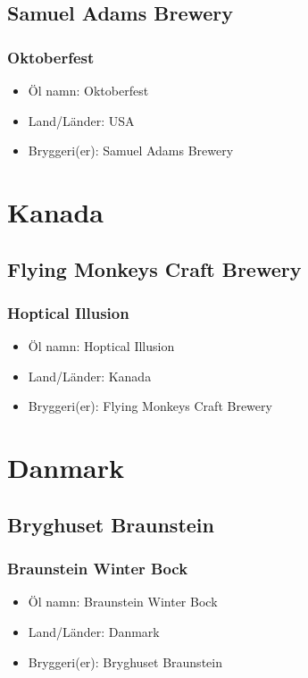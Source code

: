\documentclass[11pt]{article}
\begin{document}
\subsection{Samuel Adams Brewery}
\label{sec:orgef93744}
\subsubsection{Oktoberfest}
\label{sec:org983bc41}
\begin{itemize}
\item Öl namn: Oktoberfest
\item Land/Länder: USA
\item Bryggeri(er): Samuel Adams Brewery
\end{itemize}
\section{Kanada}
\label{sec:org4a55be3}
\subsection{Flying Monkeys Craft Brewery}
\label{sec:orgb7623c5}
\subsubsection{Hoptical Illusion}
\label{sec:org4fff781}
\begin{itemize}
\item Öl namn: Hoptical Illusion
\item Land/Länder: Kanada
\item Bryggeri(er): Flying Monkeys Craft Brewery
\end{itemize}
\section{Danmark}
\label{sec:orgb2b78cb}
\subsection{Bryghuset Braunstein}
\label{sec:orgbf3b02d}
\subsubsection{Braunstein Winter Bock}
\label{sec:org75cdcb5}
\begin{itemize}
\item Öl namn: Braunstein Winter Bock
\item Land/Länder: Danmark
\item Bryggeri(er): Bryghuset Braunstein
\end{itemize}
\end{document}
